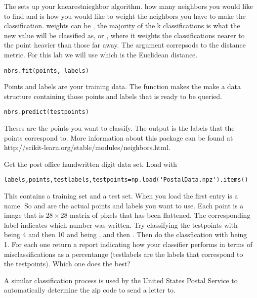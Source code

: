 The  sets up your knearestnieghbor algorithm.  how many neighbors you would like to find  and  is how you would like to weight the neighbors you have to make the classification. weights can be , the majority of the k classifications is what the new value will be classified as, or , where it weights the classifications nearer to the point heavier than those far away. The argument  correpsods to the distance metric. For this lab we will use  which is the Euclidean distance.  

\begin{lstlisting}
nbrs.fit(points, labels)
\end{lstlisting}
Points and labels are your training data. The  function makes the  make a data structure containing those points and labels that is ready to be queried. 

\begin{lstlisting}
nbrs.predict(testpoints)
\end{lstlisting}

Theses are the points you want to classify. The output is the labels that the points correspond to. More information about this package can be found at http://scikit-learn.org/stable/modules/neighbors.html.
\begin{problem}

Get the post office handwritten digit data set. Load with
\begin{lstlisting}
labels,points,testlabels,testpoints=np.load('PostalData.npz').items()
\end{lstlisting}
This contains a training set and a test set. When you load the first entry is a name. So  and  are the actual points and labels you want to use. Each point is a  image that is $28 \times 28$ matrix of pixels that has been flattened. The corresponding label indicates which number was written.  Try classifying the testpoints with  being 4 and then 10 and  being , and then . Then do the classfication with  being 1. For each one return a report indicating how your classifier performs in terms of misclassifications as a percentange (testlabels are the labels that correspond to the testpoints). Which one does the best?

A similar classification process is used by the United States Postal Service to automatically determine the zip code to send a letter to.

\end{problem}

